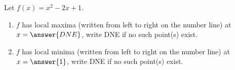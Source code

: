 \documentclass{ximera}
\author{Gregory Hartman \and Matthew Carr}
\begin{document}
\begin{exercise}






Let $f(x)=x^2-2x+1$.
\begin{enumerate}
\item		$f$ has local maxima (written from left to right on the number line) at $x=\answer{DNE}$, write DNE if no such point(s) exist.
\item		$f$ has local minima (written from left to right on the number line) at $x=\answer{1}$, write DNE if no such point(s) exist.
\end{enumerate}

\end{exercise}
\end{document}
